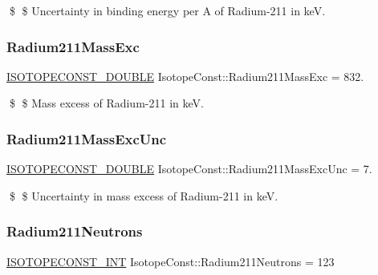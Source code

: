 \$ \$ Uncertainty in binding energy per A of Radium-\/211 in keV. \mbox{\label{group___isotope_const-_radium-_ra211_gaf864cc6da88cfbae21b53c4ac7613e82}} 
\subsubsection{\texorpdfstring{Radium211\+Mass\+Exc}{Radium211MassExc}}
{\footnotesize\ttfamily \mbox{\hyperlink{group___isotope_const-_macros_ga8f45a7272ce02c0b4c65c44636ed719a}{I\+S\+O\+T\+O\+P\+E\+C\+O\+N\+S\+T\+\_\+\+D\+O\+U\+B\+LE}} Isotope\+Const\+::\+Radium211\+Mass\+Exc = 832.}

\$ \$ Mass excess of Radium-\/211 in keV. \mbox{\label{group___isotope_const-_radium-_ra211_gaeb0b0fc3628d0094a5e9ee76283b1c30}} 
\subsubsection{\texorpdfstring{Radium211\+Mass\+Exc\+Unc}{Radium211MassExcUnc}}
{\footnotesize\ttfamily \mbox{\hyperlink{group___isotope_const-_macros_ga8f45a7272ce02c0b4c65c44636ed719a}{I\+S\+O\+T\+O\+P\+E\+C\+O\+N\+S\+T\+\_\+\+D\+O\+U\+B\+LE}} Isotope\+Const\+::\+Radium211\+Mass\+Exc\+Unc = 7.}

\$ \$ Uncertainty in mass excess of Radium-\/211 in keV. \mbox{\label{group___isotope_const-_radium-_ra211_ga785d6e6446ae568752131903127a4266}} 
\subsubsection{\texorpdfstring{Radium211\+Neutrons}{Radium211Neutrons}}
{\footnotesize\ttfamily \mbox{\hyperlink{group___isotope_const-_macros_ga5f18360b3e99483a35c32d789e62621c}{I\+S\+O\+T\+O\+P\+E\+C\+O\+N\+S\+T\+\_\+\+I\+NT}} Isotope\+Const\+::\+Radium211\+Neutrons = 123}


